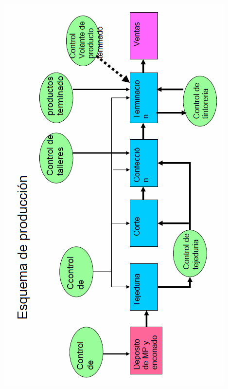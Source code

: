 \documentclass[a4paper,10pt,titlepage]{article}
\begin{document}
\begin{center}
\includegraphics[scale=0.75]{./DollyEsquemaProduccion.png}
\end{center}
\end{document}
